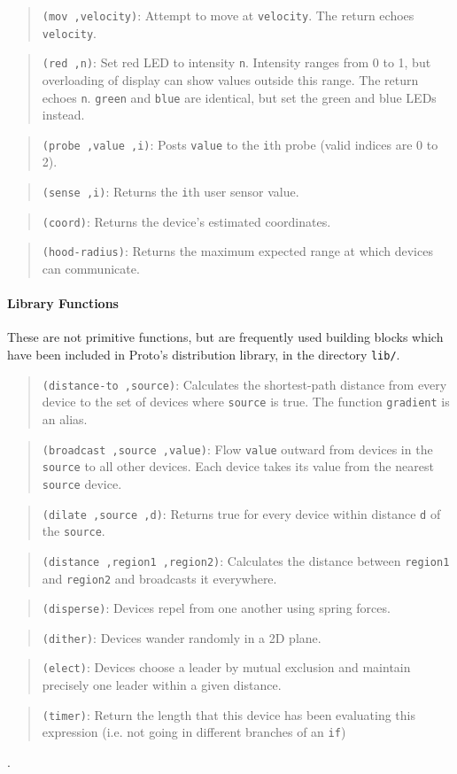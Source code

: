 \documentclass{article}
\newcommand\function[2]
{\begin{quote}{\tt #1}: #2 \end{quote}}
\newcommand\var[1]{{\tt #1}}
\begin{document}
\function{(mov ,velocity)}{Attempt to move at \var{velocity}.  The
  return echoes \var{velocity}.}

\function{(red ,n)}{Set red LED to intensity \var{n}.  Intensity
  ranges from 0 to 1, but overloading of display can show values outside
  this range.  The return echoes \var{n}.  \var{green} and \var{blue}
  are identical, but set the green and blue LEDs instead.}

\function{(probe ,value ,i)}{Posts \var{value} to the \var{i}th probe
  (valid indices are 0 to 2).}

\function{(sense ,i)}{Returns the \var{i}th user sensor value.}

\function{(coord)}{Returns the device's estimated coordinates.}
\function{(hood-radius)}{Returns the maximum expected range at which
  devices can communicate.}

\paragraph{Library Functions}

These are not primitive functions, but are frequently used building
blocks which have been included in Proto's distribution library, in
the directory {\tt lib/}.

\function{(distance-to ,source)}{Calculates the shortest-path
  distance from every device to the set of devices where \var{source}
  is true.  The function \var{gradient} is an alias.}

\function{(broadcast ,source ,value)}{Flow \var{value} outward from
  devices in the \var{source} to all other devices.  Each device takes
  its value from the nearest \var{source} device.}

\function{(dilate ,source ,d)}{Returns true for every device within
  distance \var{d} of the \var{source}.}

\function{(distance ,region1 ,region2)}{Calculates the distance
  between \var{region1} and \var{region2} and broadcasts it
  everywhere.}

\function{(disperse)}{Devices repel from one another using spring
  forces.}

\function{(dither)}{Devices wander randomly in a 2D plane.}

\function{(elect)}{Devices choose a leader by mutual exclusion
  and maintain precisely one leader within a given distance.}

\function{(timer)}{Return the length that this device has been
  evaluating this expression (i.e. not going in different branches of
  an \var{if})}.
\end{document}
